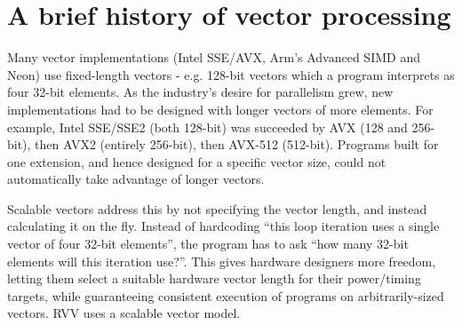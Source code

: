 \section{A brief history of vector processing}
Many vector implementations (Intel SSE/AVX, Arm's Advanced SIMD and Neon) use fixed-length vectors - e.g. 128-bit vectors which a program interprets as four 32-bit elements.
As the industry's desire for parallelism grew, new implementations had to be designed with longer vectors of more elements.
For example, Intel SSE/SSE2 (both 128-bit) was succeeded by AVX (128 and 256-bit), then AVX2 (entirely 256-bit), then AVX-512 (512-bit).
Programs built for one extension, and hence designed for a specific vector size, could not automatically take advantage of longer vectors.

Scalable vectors address this by not specifying the vector length, and instead calculating it on the fly.
Instead of hardcoding \enquote{this loop iteration uses a single vector of four 32-bit elements}, the program has to ask \enquote{how many 32-bit elements will this iteration use?}.
This gives hardware designers more freedom, letting them select a suitable hardware vector length for their power/timing targets, while guaranteeing consistent execution of programs on arbitrarily-sized vectors.
RVV uses a scalable vector model.

